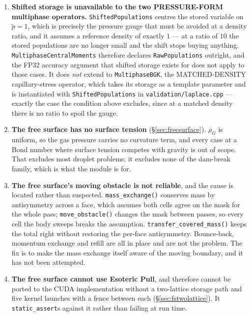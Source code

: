 \documentclass[11pt,a4paper]{article}
\newcommand{\code}[1]{\texttt{\small #1}}
\begin{document}
\begin{enumerate}[leftmargin=1.4em,itemsep=4pt]
\item \textbf{Shifted storage is unavailable to the two PRESSURE-FORM multiphase
  operators.} \code{ShiftedPopulations} centres the stored variable on
  $\tilde p = 1$, which is precisely the pressure gauge that must be avoided at a
  density ratio, and it assumes a reference density of exactly $1$ --- at a ratio
  of $10$ the stored populations are no longer small and the shift stops buying
  anything. \code{MultiphaseCentralMoments} therefore declares
  \code{RawPopulations} outright, and the FP32 accuracy argument that shifted
  storage exists for does not apply to those cases. It does \emph{not} extend to
  \code{MultiphaseBGK}, the MATCHED-DENSITY capillary-stress operator, which takes
  its storage as a template parameter and is instantiated with
  \code{ShiftedPopulations} in \code{validation/laplace.cpp} --- exactly the case
  the condition above excludes, since at a matched density there is no ratio to
  spoil the gauge.

\item \textbf{The free surface has no surface tension} (\S\ref{sec:freesurface}).
  $\rho_G$ is uniform, so the gas pressure carries no curvature term, and every
  case at a Bond number where surface tension competes with gravity is out of
  scope. That excludes most droplet problems; it excludes none of the dam-break
  family, which is what the module is for.

\item \textbf{The free surface's moving obstacle is not reliable}, and the
  cause is located rather than suspected. \code{mass\_exchange()} conserves mass
  by antisymmetry across a face, which assumes both cells agree on the mask for
  the whole pass; \code{move\_obstacle()} changes the mask between passes, so
  every cell the body sweeps breaks the assumption.
  \code{transfer\_covered\_mass()} keeps the total right without restoring the
  per-face antisymmetry. Bounce-back, momentum exchange and refill are all in
  place and are not the problem. The fix is to make the mass exchange itself
  aware of the moving boundary, and it has not been attempted.

\item \textbf{The free surface cannot use Esoteric Pull}, and therefore cannot
  be ported to the CUDA implementation without a two-lattice storage path and
  five kernel launches with a fence between each (\S\ref{sec:fstwolattice}).
  It \code{static\_assert}s against it rather than failing at run time.


\end{enumerate}
\end{document}
